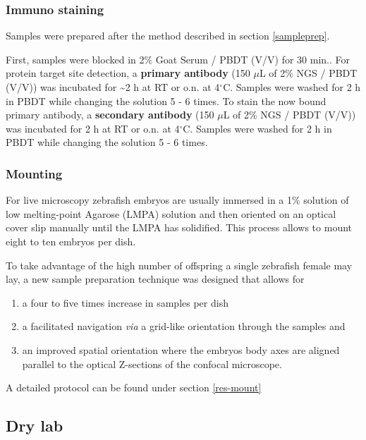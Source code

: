 \documentclass[11pt,singlespacinge,twoside]{reedthesis} %
\providecommand{\tightlist}{%
  \setlength{\itemsep}{0pt}\setlength{\parskip}{0pt}}
\theoremstyle{definition}
\theoremstyle{definition}
\theoremstyle{definition}
\theoremstyle{remark}
\begin{document}
\hypertarget{immuno-met}{%
\subsubsection{Immuno staining}\label{immuno-met}}

Samples were prepared after the method described in section \ref{sampleprep}.

First, samples were blocked in 2\(\%\) Goat Serum / PBDT (V/V) for 30 min.. For protein target site detection, a \textbf{primary antibody} (150 \(\mu\)L of 2\% NGS / PBDT (V/V)) was incubated for \textasciitilde2 h at RT or o.n. at 4\(^\circ\)C. Samples were washed for 2 h in PBDT while changing the solution 5 - 6 times. To stain the now bound primary antibody, a \textbf{secondary antibody} (150 \(\mu\)L of 2\% NGS / PBDT (V/V)) was incubated for 2 h at RT or o.n. at 4\(^\circ\)C. Samples were washed for 2 h in PBDT while changing the solution 5 - 6 times.

\hypertarget{mount-met}{%
\subsubsection{Mounting}\label{mount-met}}

For live microscopy zebrafish embryos are usually immersed in a 1\(\%\) solution of low melting-point Agarose (LMPA) solution and then oriented on an optical cover slip manually until the LMPA has solidified. This process allows to mount eight to ten embryos per dish.

To take advantage of the high number of offspring a single zebrafish female may lay, a new sample preparation technique was designed that allows for
\begin{enumerate}
\def\labelenumi{\arabic{enumi}.}
\tightlist
\item
  a four to five times increase in samples per dish
\item
  a facilitated navigation \emph{via} a grid-like orientation through the samples and
\item
  an improved spatial orientation where the embryos body axes are aligned parallel to the optical Z-sections of the confocal microscope.
\end{enumerate}
A detailed protocol can be found under section \ref{res-mount}

\hypertarget{comp-met}{%
\subsection{Dry lab}\label{comp-met}}
\end{document}
